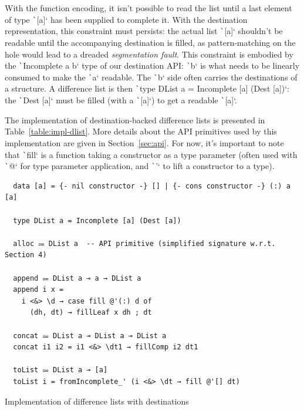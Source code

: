 \documentclass[english]{jflart}
\begin{document}
With the function encoding, it isn't possible to read the list until a last element of type \texttt`[a]` has been supplied to complete it. With the destination representation, this constraint must persists: the actual list \texttt`[a]` shouldn't be readable until the accompanying destination is filled, as pattern-matching on the hole would lead to a dreaded \emph{segmentation fault}. This constraint is embodied by the \texttt`Incomplete a b` type of our destination API: \texttt`b` is what needs to be linearly consumed to make the \texttt`a` readable. The \texttt`b` side often carries the destinations of a structure. A difference list is then \texttt`type DList a = Incomplete [a] (Dest [a])`: the \texttt`Dest [a]` must be filled (with a \texttt`[a]`) to get a readable \texttt`[a]`.

The implementation of destination-backed difference lists is presented in Table~\ref{table:impl-dlist}. More details about the API primitives used by this implementation are given in Section~\ref{sec:api}. For now, it's important to note that \texttt`fill` is a function taking a constructor as a type parameter (often used with \texttt`@` for type parameter application, and \texttt`'` to lift a constructor to a type).

\begin{table}[p]
  \small
  \begin{verbatim}
  data [a] = {- nil constructor -} [] | {- cons constructor -} (:) a [a]
  
  type DList a = Incomplete [a] (Dest [a])
  
  alloc ⩴ DList a  -- API primitive (simplified signature w.r.t. Section 4)
  
  append ⩴ DList a ⊸ a → DList a
  append i x =
    i <&> \d → case fill @'(:) d of
      (dh, dt) → fillLeaf x dh ; dt
  
  concat ⩴ DList a ⊸ DList a ⊸ DList a
  concat i1 i2 = i1 <&> \dt1 → fillComp i2 dt1
  
  toList ⩴ DList a ⊸ [a]
  toList i = fromIncomplete_' (i <&> \dt → fill @'[] dt)
  \end{verbatim}
  \caption{Implementation of difference lists with destinations}
  \label{table:impl-dlist}
  \end{table}
\end{document}
